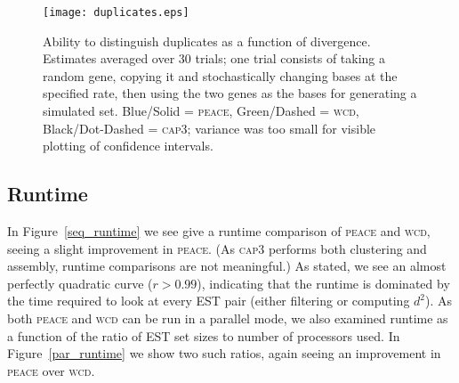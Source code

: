 \documentclass[a4paper,12pt]{article}
\begin{document}
\begin{appendix}
\begin{figure}[tbp]
\centerline{
\label{dups}
\texttt{[image: duplicates.eps]}
}
\caption{Ability to distinguish duplicates as a function of
  divergence.  Estimates averaged over 30 trials; one trial consists
  of taking a random gene, copying it and stochastically changing bases
  at the specified rate, then using the two genes as the bases for
  generating a simulated set. Blue/Solid = \textsc{peace}, Green/Dashed = \textsc{wcd}, Black/Dot-Dashed = \textsc{cap3};
  variance was too small for visible plotting of
  confidence intervals.}
\end{figure}

\subsection{Runtime}
\label{rt_section}

In Figure~\ref{seq_runtime} we see give a runtime comparison of \textsc{peace} and \textsc{wcd},
seeing a slight improvement in \textsc{peace}.  (As \textsc{cap3} performs both
clustering and assembly, runtime comparisons are not meaningful.)  As
stated, we see an almost perfectly quadratic curve ($r > 0.99$),
indicating that the runtime is dominated by the time required to look
at every EST pair (either filtering or computing $d^2$).
As both \textsc{peace} and \textsc{wcd} can be run in a parallel mode, we also
examined runtime as a function of the ratio of EST set sizes to number
of processors used.  In Figure~\ref{par_runtime} we show two such ratios,
again seeing an improvement in \textsc{peace} over \textsc{wcd}.


\end{appendix}
\end{document}
